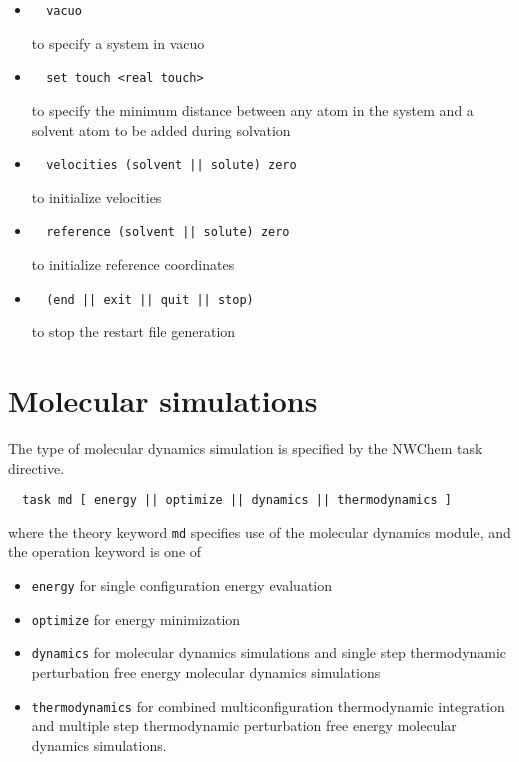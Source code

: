 \begin{itemize}
\item
\begin{verbatim}
  vacuo
\end{verbatim}
to specify a system in vacuo

\item
\begin{verbatim}
  set touch <real touch>
\end{verbatim}
to specify the minimum distance between any atom in
the system and a solvent atom to be added during solvation

\item
\begin{verbatim}
  velocities (solvent || solute) zero
\end{verbatim}
to initialize velocities

\item
\begin{verbatim}
  reference (solvent || solute) zero
\end{verbatim}
to initialize reference coordinates

\item
\begin{verbatim}
  (end || exit || quit || stop)
\end{verbatim}
to stop the restart file generation
\end{itemize}

\section{Molecular simulations}
The type of molecular dynamics simulation is specified by the
NWChem task directive.
\begin{verbatim}
  task md [ energy || optimize || dynamics || thermodynamics ]
\end{verbatim}
where the theory keyword {\tt md} specifies use of the molecular
dynamics module, and the operation keyword is one of
\begin{itemize}
\item
{\tt energy} for single configuration energy evaluation
\item
{\tt optimize} for energy minimization
\item
{\tt dynamics} for molecular dynamics simulations and single step
thermodynamic perturbation free energy molecular dynamics simulations
\item
{\tt thermodynamics} for combined multiconfiguration thermodynamic
integration and multiple step thermodynamic perturbation free
energy molecular dynamics simulations.
\end{itemize}

